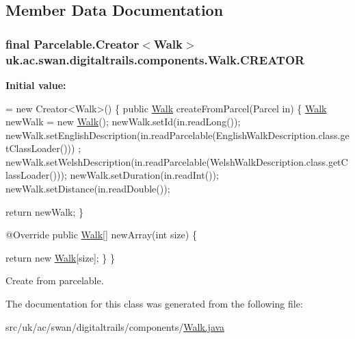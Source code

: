 \subsection{Member Data Documentation}
\hypertarget{classuk_1_1ac_1_1swan_1_1digitaltrails_1_1components_1_1_walk_ab469affd3e3855b4319e907c95387385}{
\subsubsection[{C\+R\+E\+A\+T\+O\+R}]{\setlength{\rightskip}{0pt plus 5cm}final Parcelable.\+Creator$<${\bf Walk}$>$ uk.\+ac.\+swan.\+digitaltrails.\+components.\+Walk.\+C\+R\+E\+A\+T\+O\+R\hspace{0.3cm}{\ttfamily [static]}}}\label{classuk_1_1ac_1_1swan_1_1digitaltrails_1_1components_1_1_walk_ab469affd3e3855b4319e907c95387385}
{\bfseries Initial value\+:}
\begin{DoxyCode}
= \textcolor{keyword}{new} Creator<Walk>() \{
        \textcolor{keyword}{public} \hyperlink{classuk_1_1ac_1_1swan_1_1digitaltrails_1_1components_1_1_walk_ae7daf6a8692296bf65be0a3eb065a4c9}{Walk} createFromParcel(Parcel in) \{
            \hyperlink{classuk_1_1ac_1_1swan_1_1digitaltrails_1_1components_1_1_walk_ae7daf6a8692296bf65be0a3eb065a4c9}{Walk} newWalk = \textcolor{keyword}{new} \hyperlink{classuk_1_1ac_1_1swan_1_1digitaltrails_1_1components_1_1_walk_ae7daf6a8692296bf65be0a3eb065a4c9}{Walk}();
            newWalk.setId(in.readLong());
            newWalk.setEnglishDescription(in.readParcelable(EnglishWalkDescription.class.getClassLoader()))
      ;
            newWalk.setWelshDescription(in.readParcelable(WelshWalkDescription.class.getClassLoader()));
            newWalk.setDuration(in.readInt());
            newWalk.setDistance(in.readDouble());
            
            \textcolor{keywordflow}{return} newWalk;
        \}

        @Override
        \textcolor{keyword}{public} \hyperlink{classuk_1_1ac_1_1swan_1_1digitaltrails_1_1components_1_1_walk_ae7daf6a8692296bf65be0a3eb065a4c9}{Walk}[] newArray(\textcolor{keywordtype}{int} size) \{
            
            \textcolor{keywordflow}{return} \textcolor{keyword}{new} \hyperlink{classuk_1_1ac_1_1swan_1_1digitaltrails_1_1components_1_1_walk_ae7daf6a8692296bf65be0a3eb065a4c9}{Walk}[size];
        \}
    \}
\end{DoxyCode}


Create from parcelable. 



The documentation for this class was generated from the following file\+:\begin{DoxyCompactItemize}
\item 
src/uk/ac/swan/digitaltrails/components/\hyperlink{_walk_8java}{Walk.\+java}\end{DoxyCompactItemize}

